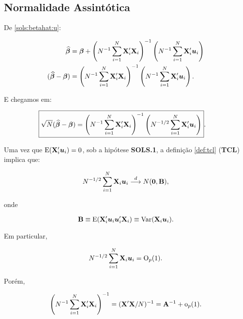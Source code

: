 \documentclass[11pt, oneside, a4paper, article]{article}
\numberwithin{equation}{section}
\begin{document}
\subsection{Normalidade Assintótica}

De \eqref{sols:betahat:u}:

\vspace{-2 em}
\begin{align*} 
\widehat{\boldsymbol{\beta}}  &=
\boldsymbol{\beta} +
\left( N^{-1} \sum_{i=1}^{N} \mathbf{X}_{i}' \mathbf{X}_{i}   \right)^{-1}
\left( N^{-1} \sum_{i=1}^{N} \mathbf{X}_{i}' \boldsymbol{u}_{i}   \right)
\\ 
(\widehat{\boldsymbol{\beta}} - \boldsymbol{\beta}) &= 
\left( N^{-1} \sum_{i=1}^{N} \mathbf{X}_{i}' \mathbf{X}_{i}   \right)^{-1}
\left( N^{-1} \sum_{i=1}^{N} \mathbf{X}_{i}' \boldsymbol{u}_{i}   \right).
\end{align*}

\noindent
E chegamos em:

\vspace{-1 em}
\begin{align} \label{sols:betahat:rootn}
\Aboxed{
\sqrt{N}(\betahatbold - \betavec) &= 
\left( N^{-1} \sum_{i=1}^{N} \Xmat_{i}' \Xmat_{i}   \right)^{-1}
\left( N^{-1/2} \sum_{i=1}^{N} \Xmat_{i}' \mbs{u}_{i}   \right)
}.
\end{align}

Uma vez que $\text{E}(\mathbf{X}_{i}' \boldsymbol{u}_{i})=0$, sob a hipótese \textbf{SOLS.1}, a definição \ref{def:tcl} (\textbf{TCL}) implica que:

\vspace{-1 em}
\begin{align*} 
N^{-1/2} \sum_{i=1}^{N} \mathbf{X}_{i} \boldsymbol{u}_{i}  \overset{d}{\longrightarrow}  N(\boldsymbol{0}, \mathbf{B}),
\end{align*}

\noindent
onde

\vspace{-1 em}
\begin{align*} 
\mathbf{B} \equiv \text{E}(\mathbf{X}_{i}' \boldsymbol{u}_{i} \boldsymbol{u}_{i}' \mathbf{X}_{i}) \equiv \text{Var}(\mathbf{X}_{i} \boldsymbol{u}_{i}).
\end{align*}

\noindent
Em particular,

\vspace{-1 em}
\begin{align*} 
N^{-1/2} \sum_{i=1}^{N} \mathbf{X}_{i} \boldsymbol{u}_{i} = \text{O}_{p}(1).
\end{align*}

Porém,

\vspace{-1 em}
\begin{align*} 
\left( N^{-1} \sum_{i=1}^{N} \mathbf{X}_{i}' \mathbf{X}_{i} \right)^{-1} = (\mathbf{X}'\mathbf{X}/N)^{-1} 
=
\mathbf{A}^{-1} + \text{o}_{p}(1).
\end{align*}
\end{document}

